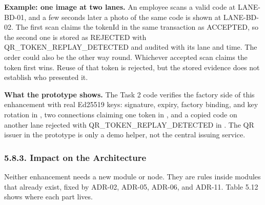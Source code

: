 \textbf{Example: one image at two lanes.} An employee scans a valid code at LANE-BD-01, and a few seconds later a photo of the same code is shown at LANE-BD-02. The first scan claims the tokenId in the same transaction as ACCEPTED, so the second one is stored as REJECTED with QR\_TOKEN\_REPLAY\_DETECTED and audited with its lane and time. The order could also be the other way round. Whichever accepted scan claims the token first wins. Reuse of that token is rejected, but the stored evidence does not establish who presented it.

\textbf{What the prototype shows.} The Task 2 code verifies the factory side of this enhancement with real Ed25519 keys: signature, expiry, factory binding, and key rotation in , two connections claiming one token in , and a copied code on another lane rejected with QR\_TOKEN\_REPLAY\_DETECTED in . The QR issuer in the prototype is only a demo helper, not the central issuing service.

\subsubsection*{5.8.3. Impact on the Architecture}

{}

Neither enhancement needs a new module or node. They are rules inside modules that already exist, fixed by ADR-02, ADR-05, ADR-06, and ADR-11. Table 5.12 shows where each part lives.


